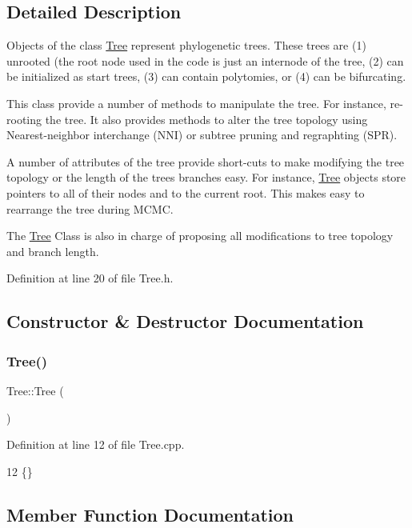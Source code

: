 \subsection{Detailed Description}
Objects of the class \hyperlink{classTree}{Tree} represent phylogenetic trees. These trees are (1) unrooted (the root node used in the code is just an internode of the tree, (2) can be initialized as start trees, (3) can contain polytomies, or (4) can be bifurcating.

This class provide a number of methods to manipulate the tree. For instance, re-\/rooting the tree. It also provides methods to alter the tree topology using Nearest-\/neighbor interchange (N\+NI) or subtree pruning and regraphting (S\+PR).

A number of attributes of the tree provide short-\/cuts to make modifying the tree topology or the length of the tree\textquotesingle{}s branches easy. For instance, \hyperlink{classTree}{Tree} objects store pointers to all of their nodes and to the current root. This makes easy to rearrange the tree during M\+C\+MC.

The \hyperlink{classTree}{Tree} Class is also in charge of proposing all modifications to tree topology and branch length. 

Definition at line 20 of file Tree.\+h.



\subsection{Constructor \& Destructor Documentation}
\mbox{\label{classTree_ad376a7c639d857312f5de2ef47482f68}} 
\subsubsection{\texorpdfstring{Tree()}{Tree()}}
{\footnotesize\ttfamily Tree\+::\+Tree (\begin{DoxyParamCaption}{ }\end{DoxyParamCaption})}



Definition at line 12 of file Tree.\+cpp.


\begin{DoxyCode}
12 \{\}
\end{DoxyCode}


\subsection{Member Function Documentation}
\mbox{\label{classTree_aba172068387b9b5be1a6750a30e8199a}} 
